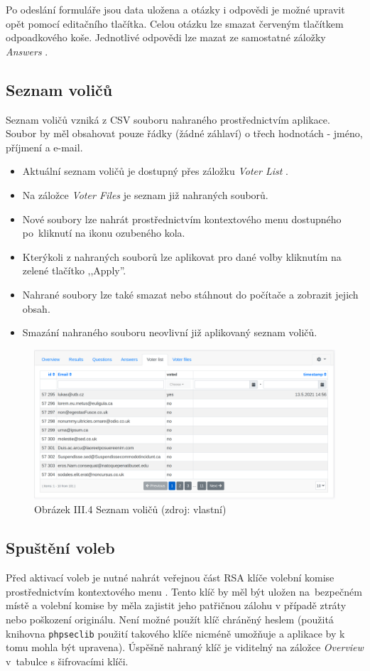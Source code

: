 Po odeslání formuláře jsou data uložena a otázky i odpovědi je možné upravit opět pomocí editačního tlačítka. Celou otázku lze smazat červeným tlačítkem odpoadkového koše. Jednotlivé odpovědi lze mazat ze samostatné záložky \textit{Answers} \;.

\subsection*{Seznam voličů}
Seznam voličů vzniká z CSV souboru nahraného prostřednictvím aplikace. Soubor by měl obsahovat pouze řádky (žádné záhlaví) o třech hodnotách - jméno, příjmení a e-mail.
\begin{itemize}
	\item Aktuální seznam voličů je dostupný přes záložku \textit{Voter List} \;.
	\item Na záložce \textit{Voter Files} \;je seznam již nahraných souborů.
	\item Nové soubory lze nahrát prostřednictvím kontextového menu dostupného po~kliknutí na ikonu ozubeného kola.
	\item Kterýkoli z nahraných souborů lze aplikovat pro dané volby kliknutím na zelené tlačítko ,,Apply''.
	\item Nahrané soubory lze také smazat nebo stáhnout do počítače a zobrazit jejich obsah.
	\item Smazání nahraného souboru neovlivní již aplikovaný seznam voličů.
\end{itemize}

\begin{figure}[h]
	\centering
	\includegraphics[width=1\linewidth]{graphics/attachements/noveVolbySeznam.png}
	\captionsetup{width=1\linewidth}
	\caption*{Obrázek III.4 Seznam voličů (zdroj: vlastní)}
\end{figure}
\clearpage

\subsection*{Spuštění voleb}
Před aktivací voleb je nutné nahrát veřejnou část RSA klíče volební komise prostřednictvím kontextového menu  \;. Tento klíč by měl být uložen na~bezpečném místě a volební komise by měla zajistit jeho patřičnou zálohu v případě ztráty nebo poškození originálu. Není možné použít klíč chráněný heslem (použitá knihovna \texttt{phpseclib} použití takového klíče nicméně umožňuje a aplikace by k tomu mohla být upravena). Úspěšně nahraný klíč je viditelný na záložce \textit{Overview} \;v~tabulce s šifrovacími klíči.

